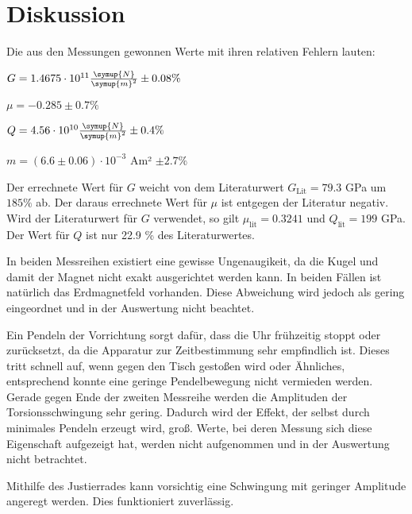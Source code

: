 \section{Diskussion}
\label{sec:Diskussion}

Die aus den Messungen gewonnen Werte mit ihren relativen Fehlern lauten:

\vspace{0.5em}
\centerline{$G = 1.4675 \cdot 10^{11} \frac{\symup{N}}{\symup{m}^2} \pm 0.08 \%$}

\vspace{0.4em}

\centerline{$\mu = -0.285 \pm 0.7\%$}

\vspace{0.4em}

\centerline{$Q = 4.56 \cdot 10^{10} \frac{\symup{N}}{\symup{m}^2} \pm 0.4 \%$}

\vspace{0.4em}

\centerline{$m = (6.6 \pm 0.06) \cdot 10^{-3}$ Am² $\pm 2.7 \%$}
\vspace{0.5em}

Der errechnete Wert für $G$ weicht von dem Literaturwert $G_\text{Lit} = 79.3$ GPa \cite{G-stahl} um $185 \%$ ab.
Der daraus errechnete Wert für $\mu$ ist entgegen der Literatur negativ.
Wird der Literaturwert für $G$ verwendet, so gilt $\mu_\text{lit} = 0.3241$ und $Q_\text{lit} = 199$ GPa.
Der Wert für $Q$ ist nur 22.9 \% des Literaturwertes.

In beiden Messreihen existiert eine gewisse Ungenaugikeit, da die Kugel und damit der Magnet nicht exakt ausgerichtet werden kann.
In beiden Fällen ist natürlich das Erdmagnetfeld vorhanden. Diese Abweichung wird jedoch als gering eingeordnet und in der Auswertung nicht beachtet.

Ein Pendeln der Vorrichtung sorgt dafür, dass die Uhr frühzeitig stoppt oder zurücksetzt, da die Apparatur zur Zeitbestimmung sehr empfindlich ist. Dieses tritt schnell auf, wenn gegen den Tisch gestoßen wird oder Ähnliches, entsprechend konnte eine geringe Pendelbewegung nicht vermieden werden.
Gerade gegen Ende der zweiten Messreihe werden die Amplituden der Torsionsschwingung sehr gering. Dadurch wird der Effekt, der selbst durch minimales Pendeln erzeugt wird, groß.
Werte, bei deren Messung sich diese Eigenschaft aufgezeigt hat, werden nicht aufgenommen und in der Auswertung nicht betrachtet.

Mithilfe des Justierrades kann vorsichtig eine Schwingung mit geringer Amplitude angeregt werden. Dies funktioniert zuverlässig.

